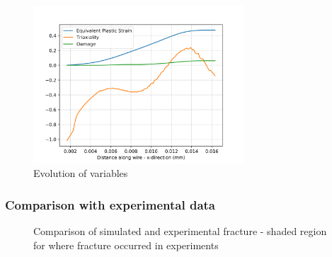 \documentclass[sn-mathphys,Numbered,draft]{sn-jnl}%
\begin{document}
\begin{figure}[htb]
\begin{center}
	\includegraphics[width=0.7\textwidth]{./Figures/SimulationAndAnalysis/compareCellData/cellCompare.png}
\caption{Evolution of variables}
\label{fig:notchedRoundBAr}
\end{center}
\end{figure}
\FloatBarrier

\subsubsection{Comparison with experimental data}

\begin{figure}[t!]
	\centering
	  \qquad
		\caption{Comparison of simulated and experimental fracture - shaded region for where fracture occurred in experiments}
	\label{label_for_entire_figure}
\end{figure}
\end{document}
